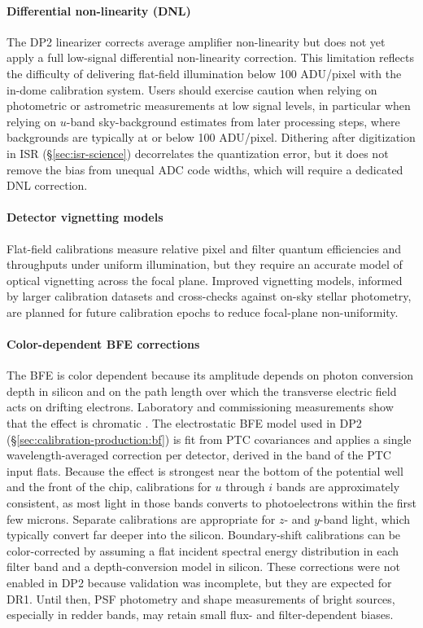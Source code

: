 \paragraph{Differential non-linearity (DNL)}
The DP2 linearizer corrects average amplifier non-linearity but does not yet apply a full low-signal differential non-linearity correction.
This limitation reflects the difficulty of delivering flat-field illumination below 100 ADU/pixel with the in-dome calibration system.
Users should exercise caution when relying on photometric or astrometric measurements at low signal levels, in particular when relying on $u$-band sky-background estimates from later processing steps, where backgrounds are typically at or below 100 ADU/pixel.
Dithering after digitization in ISR (\S\ref{sec:isr-science}) decorrelates the quantization error, but it does not remove the bias from unequal ADC code widths, which will require a dedicated DNL correction.

\paragraph{Detector vignetting models}
Flat-field calibrations measure relative pixel and filter quantum efficiencies and throughputs under uniform illumination, but they require an accurate model of optical vignetting across the focal plane.
Improved vignetting models, informed by larger calibration datasets and cross-checks against on-sky stellar photometry, are planned for future calibration epochs to reduce focal-plane non-uniformity.

\paragraph{Color-dependent BFE corrections}
The BFE is color dependent because its amplitude depends on photon conversion depth in silicon and on the path length over which the transverse electric field acts on drifting electrons.
Laboratory and commissioning measurements show that the effect is chromatic \citep[$a_{00}^{\mathrm{y\text{-}band}} = 0.94 \times a_{00}^{\mathrm{r\text{-}band}}$, see][]{2024PASP..136d5003B}.
The electrostatic BFE model used in DP2 (\S\ref{sec:calibration-production:bf}) is fit from PTC covariances and applies a single wavelength-averaged correction per detector, derived in the band of the PTC input flats.
Because the effect is strongest near the bottom of the potential well and the front of the chip, calibrations for $u$ through $i$ bands are approximately consistent, as most light in those bands converts to photoelectrons within the first few microns.
Separate calibrations are appropriate for $z$- and $y$-band light, which typically convert far deeper into the silicon.
Boundary-shift calibrations can be color-corrected by assuming a flat incident spectral energy distribution in each filter band and a depth-conversion model in silicon.
These corrections were not enabled in DP2 because validation was incomplete, but they are expected for DR1.
Until then, PSF photometry and shape measurements of bright sources, especially in redder bands, may retain small flux- and filter-dependent biases.

